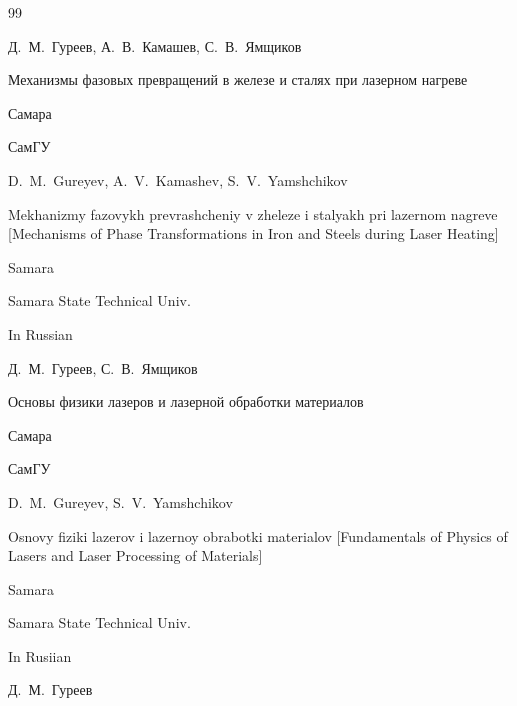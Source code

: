 \begin{thebibliography}{99}




\by Д.~М.~Гуреев, А.~В.~Камашев, С.~В.~Ямщиков

\book Механизмы фазовых превращений в железе и сталях при лазерном нагреве

\publaddr Самара

\publ СамГУ



\misctransl

\by D.~M.~Gureyev, A.~V.~Kamashev, S.~V.~Yamshchikov

\book Mekhanizmy fazovykh prevrashcheniy v zheleze i stalyakh pri lazernom nagreve \rm [Mechanisms of Phase Transformations in Iron and Steels during Laser Heating] 

\publaddr Samara

\publ Samara State Technical Univ.



\lang In Russian




\by Д.~М.~Гуреев, С.~В.~Ямщиков

\book Основы физики лазеров и лазерной обработки материалов

\publaddr Самара

\publ СамГУ



\misctransl

\by D.~M.~Gureyev, S.~V.~Yamshchikov

\book  Osnovy fiziki lazerov i lazernoy obrabotki materialov \rm [Fundamentals of Physics of Lasers and Laser Processing of Materials]

\publaddr Samara

\publ Samara State Technical Univ.



\lang In Rusiian






\by Д.~М.~Гуреев


\end{thebibliography}
